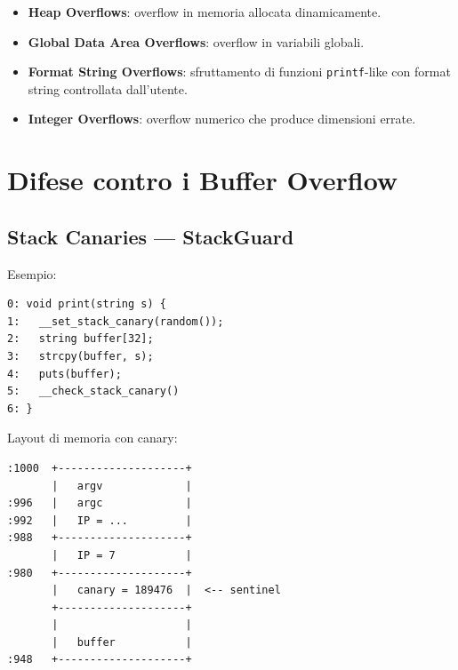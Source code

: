 \begin{itemize}
  \item \textbf{Heap Overflows}: overflow in memoria allocata dinamicamente.
  \item \textbf{Global Data Area Overflows}: overflow in variabili globali.
  \item \textbf{Format String Overflows}: sfruttamento di funzioni \texttt{printf}-like con format string controllata dall'utente.
  \item \textbf{Integer Overflows}: overflow numerico che produce dimensioni errate.
\end{itemize}

\section{Difese contro i Buffer Overflow}

\subsection{Stack Canaries --- StackGuard}


Esempio:
\begin{verbatim}
0: void print(string s) {
1:   __set_stack_canary(random());
2:   string buffer[32];
3:   strcpy(buffer, s);
4:   puts(buffer);
5:   __check_stack_canary()
6: }
\end{verbatim}

Layout di memoria con canary:
\begin{verbatim}
:1000  +--------------------+
       |   argv             |
:996   |   argc             |
:992   |   IP = ...         |
:988   +--------------------+
       |   IP = 7           |
:980   +--------------------+
       |   canary = 189476  |  <-- sentinel
       +--------------------+
       |                    |
       |   buffer           |
:948   +--------------------+
\end{verbatim}

